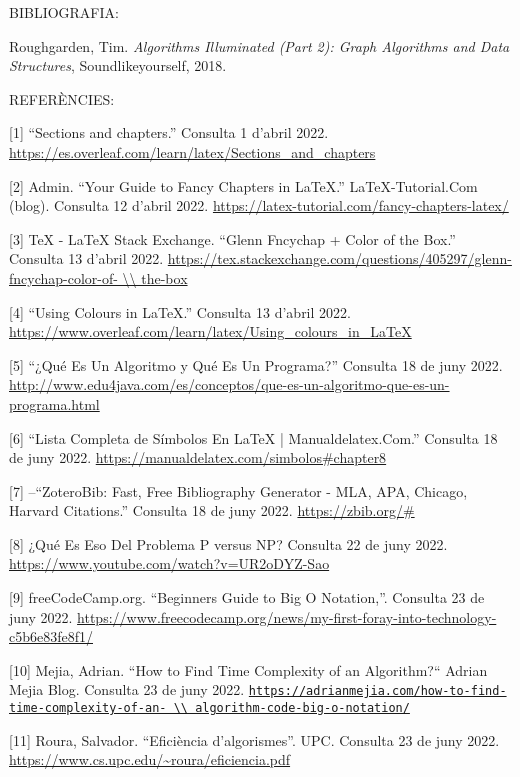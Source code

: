 {\large BIBLIOGRAFIA:}

Roughgarden, Tim. \textit{Algorithms Illuminated (Part 2): Graph Algorithms and Data Structures}, Soundlikeyourself, 2018. 

\vspace{1cm}

{\large REFERÈNCIES:}

[1] “Sections and chapters.” Consulta 1 d’abril 2022. \url{https://es.overleaf.com/learn/latex/Sections_and_chapters}

[2] Admin. “Your Guide to Fancy Chapters in LaTeX.” LaTeX-Tutorial.Com (blog). Consulta 12 d’abril 2022. \url{https://latex-tutorial.com/fancy-chapters-latex/}

[3] TeX - LaTeX Stack Exchange. “Glenn Fncychap + Color of the Box.” Consulta 13 d’abril 2022. \url{https://tex.stackexchange.com/questions/405297/glenn-fncychap-color-of- \\ the-box} 

[4] “Using Colours in LaTeX.” Consulta 13 d’abril 2022. \url{https://www.overleaf.com/learn/latex/Using_colours_in_LaTeX}

[5] “¿Qué Es Un Algoritmo y Qué Es Un Programa?” Consulta 18 de juny 2022. \url{http://www.edu4java.com/es/conceptos/que-es-un-algoritmo-que-es-un-programa.html}

[6] “Lista Completa de Símbolos En LaTeX | Manualdelatex.Com.” Consulta 18 de juny 2022. \url{https://manualdelatex.com/simbolos#chapter8}

[7] --“ZoteroBib: Fast, Free Bibliography Generator - MLA, APA, Chicago, Harvard Citations.” Consulta 18 de juny 2022.   \url{https://zbib.org/#}

[8] ¿Qué Es Eso Del Problema P versus NP? Consulta 22 de juny 2022. \url{https://www.youtube.com/watch?v=UR2oDYZ-Sao}

[9] freeCodeCamp.org. “Beginners Guide to Big O Notation,”. Consulta 23 de juny 2022. \url{https://www.freecodecamp.org/news/my-first-foray-into-technology-c5b6e83fe8f1/}

[10] Mejia, Adrian. “How to Find Time Complexity of an Algorithm?“ Adrian Mejia Blog. Consulta 23 de juny 2022. \href{https://adrianmejia.com/how-to-find-time-complexity-of-an-algorithm-code-big-o-notation/}{\nolinkurl{https://adrianmejia.com/how-to-find-time-complexity-of-an- \\ algorithm-code-big-o-notation/}}

[11] Roura, Salvador. “Eficiència d’algorismes”. UPC. Consulta 23 de juny 2022. \url{https://www.cs.upc.edu/~roura/eficiencia.pdf}


